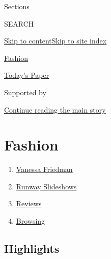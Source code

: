 Sections

SEARCH

\protect\hyperlink{site-content}{Skip to
content}\protect\hyperlink{site-index}{Skip to site index}

\href{https://www.nytimes.com/section/fashion}{Fashion}

\href{https://myaccount.nytimes.com/auth/login?response_type=cookie\&client_id=vi}{}

\href{https://www.nytimes.com/section/todayspaper}{Today's Paper}

Supported by

\protect\hyperlink{after-sponsor}{Continue reading the main story}

\hypertarget{fashion}{%
\section{Fashion}\label{fashion}}

\begin{enumerate}
\def\labelenumi{\arabic{enumi}.}
\tightlist
\item
  \href{/by/vanessa-friedman}{Vanessa Friedman}
\item
  \href{/spotlight/fashion-runway-slideshows}{Runway Slideshows}
\item
  \href{/spotlight/fashion-reviews}{Reviews}
\item
  \href{/column/browsing}{Browsing}
\end{enumerate}

\hypertarget{highlights}{%
\subsection{Highlights}\label{highlights}}

